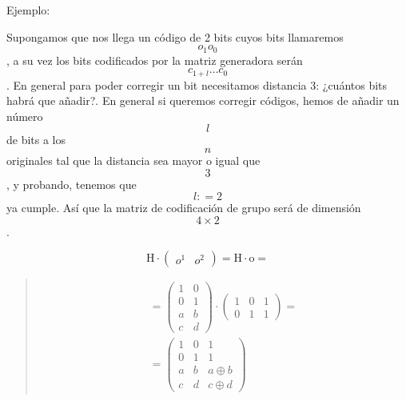 \documentclass[
]{article}
\begin{document}
\begin{enumerate}
\begin{enumerate}
\begin{enumerate}
\begin{enumerate}
        Ejemplo:

        Supongamos que nos llega un código de 2 bits cuyos bits
        llamaremos \[o_{1}o_{0}\], a su vez los bits codificados por la
        matriz generadora serán\[c_{1 + l}\ldots c_{0}\]. En general
        para poder corregir un bit necesitamos distancia 3: ¿cuántos
        bits habrá que añadir?. En general si queremos corregir códigos,
        hemos de añadir un número \[l\]de bits a los \[n\] originales
        tal que la distancia sea mayor o igual que\[3\], y probando,
        tenemos que \[l{: = 2}\] ya cumple. Así que la matriz de
        codificación de grupo será de dimensión\[4 \times 2\].

        \[{{\mathtt{\mathrm{H}} \cdot \begin{pmatrix}
        o^{1} & o^{2}
        \end{pmatrix}} = {\mathtt{\mathrm{H}} \cdot \mathtt{\mathrm{o}}}} =\]
      \end{enumerate}
    \end{enumerate}
  \end{enumerate}
\end{enumerate}

\begin{quote}
\[\begin{matrix}
{{= {\begin{pmatrix}
1 & 0 \\
0 & 1 \\
a & b \\
c & d
\end{pmatrix} \cdot \begin{pmatrix}
1 & 0 & 1 \\
0 & 1 & 1
\end{pmatrix}}} =} \\
{= \begin{pmatrix}
1 & 0 & 1 \\
0 & 1 & 1 \\
a & b & {a \oplus b} \\
c & d & {c \oplus d}
\end{pmatrix}}
\end{matrix}\]
\end{quote}
\end{document}
